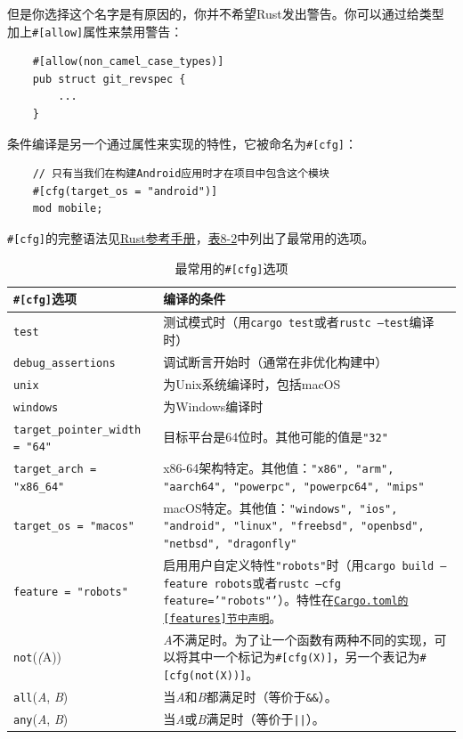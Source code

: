 但是你选择这个名字是有原因的，你并不希望Rust发出警告。你可以通过给类型加上\texttt{\#[allow]}属性来禁用警告：
\begin{verbatim}
    #[allow(non_camel_case_types)]
    pub struct git_revspec {
        ...
    }
\end{verbatim}

条件编译是另一个通过属性来实现的特性，它被命名为\texttt{\#[cfg]}：
\begin{verbatim}
    // 只有当我们在构建Android应用时才在项目中包含这个模块
    #[cfg(target_os = "android")]
    mod mobile;
\end{verbatim}

\texttt{\#[cfg]}的完整语法见\href{https://doc.rust-lang.org/reference/conditional-compilation.html}{Rust参考手册}，\hyperref[t8-2]{表8-2}中列出了最常用的选项。

\begin{table}[htbp]
    \centering
    \caption{最常用的\texttt{\#[cfg]}选项}
    \label{t8-2}
    \begin{tabular}{p{}p{}}
        \hline
        \textbf{\texttt{\#[cfg]}选项}   & \textbf{编译的条件} \\
        \hline
        \texttt{test}   & 测试模式时（用\texttt{cargo test}或者\texttt{rustc --test}编译时） \\
        \rowcolor{tablecolor}
        \texttt{debug\_assertions} & 调试断言开始时（通常在非优化构建中） \\
        \texttt{unix}   & 为Unix系统编译时，包括macOS \\
        \rowcolor{tablecolor}
        \texttt{windows}& 为Windows编译时 \\
        \texttt{target\_pointer\_width = "64"} & 目标平台是64位时。其他可能的值是\texttt{"32"} \\
        \rowcolor{tablecolor}
        \texttt{target\_arch = "x86\_64"} & x86-64架构特定。其他值：\texttt{"x86", "arm", "aarch64", "powerpc", "powerpc64", "mips"} \\
        \texttt{target\_os = "macos"} & macOS特定。其他值：\texttt{"windows", "ios", "android", "linux", "freebsd", "openbsd", "netbsd", "dragonfly"} \\
        \rowcolor{tablecolor}
        \texttt{feature = "robots"} & 启用用户自定义特性\texttt{"robots"}时（用\texttt{cargo build --feature robots}或者\texttt{rustc --cfg feature='"robots"'}）。特性在\href{https://doc.rust-lang.org/cargo/reference/manifest.html}{\texttt{Cargo.toml的\texttt{[features]}节中声明}}。 \\
        \texttt{not}(\emph(A)) & \emph{A}不满足时。为了让一个函数有两种不同的实现，可以将其中一个标记为\texttt{\#[cfg(X)]}，另一个表记为\texttt{\#[cfg(not(X))]}。 \\
        \rowcolor{tablecolor}
        \texttt{all}(\emph{A}, \emph{B}) & 当\emph{A}和\emph{B}都满足时（等价于\texttt{\&\&}）。 \\
        \texttt{any}(\emph{A}, \emph{B}) & 当\emph{A}或\emph{B}满足时（等价于\texttt{||}）。 \\
    \end{tabular}
\end{table}

